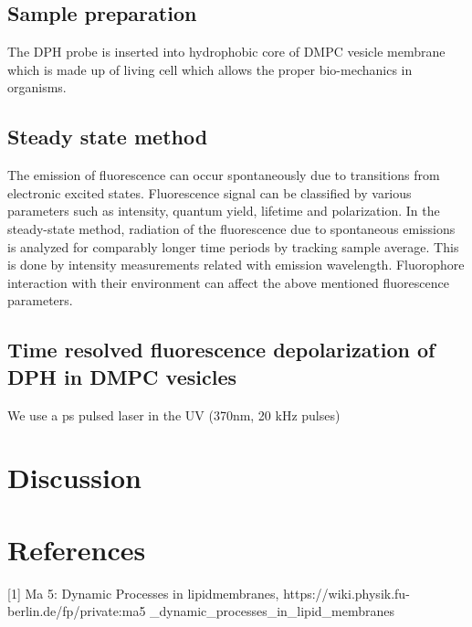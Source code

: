 \documentclass{article}
\begin{document}
\subsection{Sample preparation}
The DPH probe is inserted into hydrophobic core of DMPC vesicle membrane which is made up of living cell which allows the proper bio-mechanics in organisms.
\subsection{Steady state method}
The emission of fluorescence can occur spontaneously due to transitions from electronic excited states. Fluorescence signal can be classified by various parameters such as intensity, quantum yield, lifetime and polarization. In the steady-state method, radiation of the fluorescence due to spontaneous emissions is analyzed for comparably longer time periods by tracking sample average.  This is done by intensity measurements related with emission wavelength. Fluorophore interaction with their environment can affect the above mentioned fluorescence parameters. 

\subsection{Time resolved fluorescence depolarization of DPH in DMPC vesicles}
We use a ps pulsed laser in the UV (370nm, 20 kHz pulses)
\section{Discussion}



\section{References}

[1] Ma 5: Dynamic Processes in lipidmembranes, https://wiki.physik.fu-berlin.de/fp/private:ma5 \_dynamic\_processes\_in\_lipid\_membranes
\end{document}
